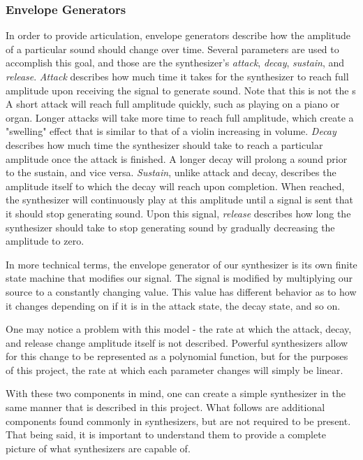\documentclass[12pt]{article}
\begin{document}
\subsubsection{Envelope Generators}
In order to provide articulation, envelope generators describe how the amplitude of a particular sound should change over time. Several parameters are used to accomplish this goal, and those are the synthesizer's \textit{attack}, \textit{decay}, \textit{sustain}, and \textit{release}. \textit{Attack} describes how much time it takes for the synthesizer to reach full amplitude upon receiving the signal to generate sound. Note that this is not the s A short attack will reach full amplitude quickly, such as playing on a piano or organ. Longer attacks will take more time to reach full amplitude, which create a "swelling" effect that is similar to that of a violin increasing in volume. \textit{Decay} describes how much time the synthesizer should take to reach a particular amplitude once the attack is finished. A longer decay will prolong a sound prior to the sustain, and vice versa. \textit{Sustain}, unlike attack and decay, describes the amplitude itself to which the decay will reach upon completion. When reached, the synthesizer will continuously play at this amplitude until a signal is sent that it should stop generating sound. Upon this signal, \textit{release} describes how long the synthesizer should take to stop generating sound by gradually decreasing the amplitude to zero. 

In more technical terms, the envelope generator of our synthesizer is its own finite state machine that modifies our signal. The signal is modified by multiplying our source to a constantly changing value. This value has different behavior as to how it changes depending on if it is in the attack state, the decay state, and so on.  

One may notice a problem with this model - the rate at which the attack, decay, and release change amplitude itself is not described. Powerful synthesizers allow for this change to be represented as a polynomial function, but for the purposes of this project, the rate at which each parameter changes will simply be linear. 

With these two components in mind, one can create a simple synthesizer in the same manner that is described in this project. What follows are additional components found commonly in synthesizers, but are not required to be present. That being said, it is important to understand them to provide a complete picture of what synthesizers are capable of. 
\end{document}
